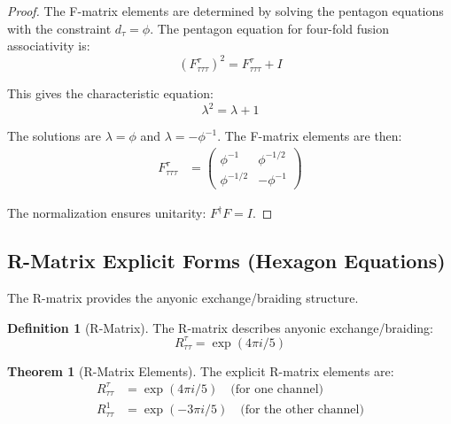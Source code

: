 \documentclass[11pt]{article}
\theoremstyle{definition}
\newtheorem{theorem}{Theorem}[section]
\newtheorem{definition}{Definition}[section]
\newcommand{\goldenratio}{\phi}
\begin{document}
\begin{proof}
The F-matrix elements are determined by solving the pentagon equations with the constraint $d_\tau = \goldenratio$. The pentagon equation for four-fold fusion associativity is:
\begin{equation}
(F^{\tau}_{\tau\tau\tau})^2 = F^{\tau}_{\tau\tau\tau} + I
\end{equation}

This gives the characteristic equation:
\begin{equation}
\lambda^2 = \lambda + 1
\end{equation}

The solutions are $\lambda = \goldenratio$ and $\lambda = -\goldenratio^{-1}$. The F-matrix elements are then:
\begin{align}
F^{\tau}_{\tau\tau\tau} &= \begin{pmatrix}
\goldenratio^{-1} & \goldenratio^{-1/2} \\
\goldenratio^{-1/2} & -\goldenratio^{-1}
\end{pmatrix}
\end{align}

The normalization ensures unitarity: $F^\dagger F = I$.
\end{proof}

\subsection{R-Matrix Explicit Forms (Hexagon Equations)}

The R-matrix provides the anyonic exchange/braiding structure.

\begin{definition}[R-Matrix]
The R-matrix describes anyonic exchange/braiding:
\begin{equation}
R^{\tau}_{\tau\tau} = \exp(4\pi i/5)
\end{equation}
\end{definition}

\begin{theorem}[R-Matrix Elements]
The explicit R-matrix elements are:
\begin{align}
R^{\tau}_{\tau\tau} &= \exp(4\pi i/5) \quad \text{(for one channel)} \\
R^{1}_{\tau\tau} &= \exp(-3\pi i/5) \quad \text{(for the other channel)}
\end{align}
\end{theorem}
\end{document}
